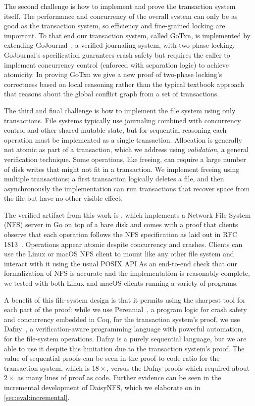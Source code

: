 The second challenge is how to implement and prove the transaction system
itself. The performance and concurrency of the overall system can only be as
good as the transaction system, so efficiency and fine-grained locking are
important. To that end our transaction system, called GoTxn, is implemented by
extending GoJournal~\cite{chajed:gojournal}, a verified journaling system, with
two-phase locking. GoJournal's specification guarantees crash safety but
requires the caller to implement concurrency control (enforced with separation logic) to achieve atomicity.
In proving GoTxn we give a new proof of two-phase
locking's correctness based on local reasoning rather than
the typical textbook approach that reasons about the global conflict graph from
a set of transactions.

The third and final challenge is how to implement the file system using only
transactions. File systems typically use journaling combined with concurrency
control and other shared mutable state, but for sequential reasoning each
operation must be implemented as a single transaction. Allocation is generally
not atomic as part of a transaction, which we address using \emph{validation}, a
general verification technique.
Some operations, like freeing, can require a large
number of disk writes that might not fit in a transaction. We implement freeing
using multiple transactions; a first transaction logically deletes a file, and
then asynchronously the implementation can run transactions that recover space
from the file but have no other visible effect.

The verified artifact from this work is \sys, which implements a
Network File System (NFS) server in Go on top of a bare disk and comes
with a proof that clients observe that each operation follows the NFS
specification as laid out in RFC 1813~\cite{RFC:1813}. Operations appear atomic
despite concurrency and crashes. Clients can use the Linux or macOS
NFS client to mount \sys like any other file system and interact with
it using the usual POSIX API.\@  As an end-to-end check that our
formalization of NFS is accurate and the implementation is reasonably
complete, we tested with both Linux and macOS clients running a
variety of programs.

A benefit of this file-system design is that it permits using the
sharpest tool for each part of the proof: while we use
Perennial~\cite{chajed:gojournal}, a program logic for crash safety
and concurrency embedded in Coq, for the
transaction system's proof, we use Dafny~\cite{leino:dafny}, a verification-aware
programming language with powerful automation, for the file-system operations.
Dafny is a purely sequential language, but we are able to use it despite this
limitation due to the transaction system's proof. The value of
sequential proofs can be seen in the proof-to-code ratio for the transaction
system, which is $18\times$, versus the Dafny proofs which required about
$2\times$ as many lines of proof as code. Further evidence can be seen in the
incremental development of DaisyNFS, which we elaborate on in
\cref{sec:eval:incremental}.

